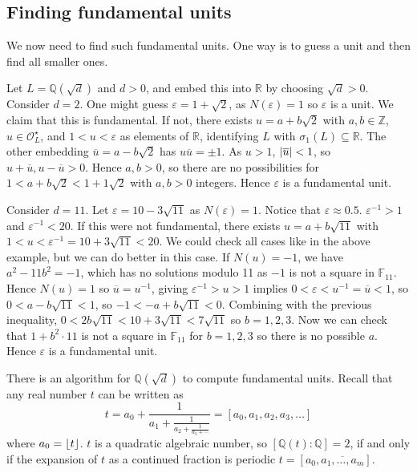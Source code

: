 \subsection{Finding fundamental units}
We now need to find such fundamental units.
One way is to guess a unit and then find all smaller ones.
\begin{example}
    Let \( L = \mathbb Q(\sqrt{d}) \) and \( d > 0 \), and embed this into \( \mathbb R \) by choosing \( \sqrt{d} > 0 \).
    Consider \( d = 2 \).
    One might guess \( \varepsilon = 1 + \sqrt{2} \), as \( N(\varepsilon) = 1 \) so \( \varepsilon \) is a unit.
    We claim that this is fundamental.
    If not, there exists \( u = a + b\sqrt{2} \) with \( a, b \in \mathbb Z \), \( u \in \mathcal O_L^\star \), and \( 1 < u < \varepsilon \) as elements of \( \mathbb R \), identifying \( L \) with \( \sigma_1(L) \subseteq \mathbb R \).
    The other embedding \( \overline u = a - b\sqrt{2} \) has \( u \overline u = \pm 1 \).
    As \( u > 1 \), \( \abs{\overline u} < 1 \), so \( u + \overline u, u - \overline u > 0 \).
    Hence \( a, b > 0 \), so there are no possibilities for \( 1 < a + b \sqrt{2} < 1 + 1 \sqrt{2} \) with \( a, b > 0 \) integers.
    Hence \( \varepsilon \) is a fundamental unit.
\end{example}
\begin{example}
    Consider \( d = 11 \).
    Let \( \varepsilon = 10 - 3\sqrt{11} \) as \( N(\varepsilon) = 1 \).
    Notice that \( \varepsilon \approx 0.5 \).
    \( \varepsilon^{-1} > 1 \) and \( \varepsilon^{-1} < 20 \).
    If this were not fundamental, there exists \( u = a + b \sqrt{11} \) with \( 1 < u < \varepsilon^{-1} = 10 + 3\sqrt{11} < 20 \).
    We could check all cases like in the above example, but we can do better in this case.
    If \( N(u) = -1 \), we have \( a^2 - 11b^2 = -1 \), which has no solutions modulo 11 as \( -1 \) is not a square in \( \mathbb F_{11} \).
    Hence \( N(u) = 1 \) so \( \overline u = u^{-1} \), giving \( \varepsilon^{-1} > u > 1 \) implies \( 0 < \varepsilon < u^{-1} = \overline u < 1 \), so \( 0 < a - b \sqrt{11} < 1 \), so \( -1 < -a + b \sqrt{11} < 0 \).
    Combining with the previous inequality, \( 0 < 2b \sqrt{11} < 10 + 3\sqrt{11} < 7 \sqrt{11} \) so \( b = 1, 2, 3 \).
    Now we can check that \( 1 + b^2 \cdot 11 \) is not a square in \( \mathbb F_{11} \) for \( b = 1, 2, 3 \) so there is no possible \( a \).
    Hence \( \varepsilon \) is a fundamental unit.
\end{example}
\begin{remark}
    There is an algorithm for \( \mathbb Q(\sqrt{d}) \) to compute fundamental units.
    Recall that any real number \( t \) can be written as
    \[ t = a_0 + \frac{1}{a_1 + \frac{1}{a_2 + \frac{1}{a_3 + \cdots}}} = [a_0, a_1, a_2, a_3, \dots] \]
    where \( a_0 = \floor*{t} \).
    \( t \) is a quadratic algebraic number, so \( [\mathbb Q(t) : \mathbb Q] = 2 \), if and only if the expansion of \( t \) as a continued fraction is periodic \( t = [a_0, \overline{a_1, \dots, a_m}] \).
\end{remark}
